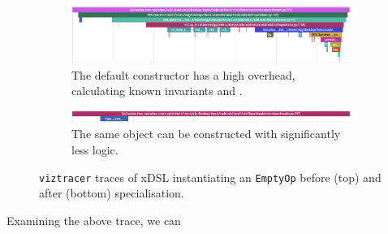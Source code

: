 \begin{figure}[H]
    \centering
    \begin{subfigure}[b]{\textwidth}
        \centering
        \includegraphics[width=\textwidth]{images/specialising_optimising_xdsl_rewriting/original_empty_create}
        \captionsetup{width=0.8\textwidth}
        \caption{The default constructor has a high overhead, calculating known invariants and .}
        \label{fig:ubenchmark-hastrait-xdsl-viztracer}
    \end{subfigure}
    \begin{subfigure}[b]{\textwidth}
        \centering
        \includegraphics[width=\textwidth]{images/specialising_optimising_xdsl_rewriting/optimised_empty_create}
        \captionsetup{width=0.8\textwidth}
        \caption{The same object can be constructed with significantly less logic.}
        \label{fig:ubenchmark-gettrait-xdsl-viztracer}
    \end{subfigure}
    \caption{\texttt{viztracer} traces of xDSL instantiating an \texttt{EmptyOp} before (top) and after (bottom) specialisation.}
    \label{fig:ubenchmark-hasgettrait-xdsl-viztracer}
\end{figure}

Examining the above trace, we can



